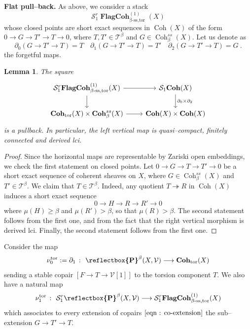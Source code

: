 \documentclass[11pt]{article}
\newtheorem{lemma}[theorem]{Lemma}
\newcommand{\segal}{\mathcal{S}}
\newcommand{\tbeta}{\mathcal{T}^{\beta}}
\newcommand{\tbetastack}{\boldsymbol{\operatorname{Coh}}_{\operatorname{tor}}(X)}
\newcommand{\coh}{\operatorname{Coh}}
\newcommand{\cohbetass}{\operatorname{Coh}^{ss}_{\beta}(X)}
\newcommand{\cohbetassstack}{\boldsymbol{\operatorname{Coh}}^{ss}_{\beta}(X)}
\newcommand{\cohflat}{\boldsymbol{\operatorname{Coh}}}
\newcommand{\framing}{\mathcal{V}}
\newcommand{\copairs}{\boldsymbol{\cop}^{\beta}(X,\mathcal{V})}
\newcommand{\cop}{\reflectbox{\ensuremath{\operatorname{P}}}}
\begin{document}
    \noindent \textbf{Flat pull--back. } As above, we consider a stack
    \[
\segal_1^r\boldsymbol{\operatorname{FlagCoh}}^{(1)}_{\operatorname{\beta-ss,tor}}(X)
    \]
    whose closed points are short exact sequences in $\coh(X)$ of the form $0 \rightarrow G\rightarrow T' \rightarrow T \rightarrow 0$, where $T , T'\in \tbeta$ and $G\in \cohbetass$. Let us denote as
\[
    \partial_0(G\rightarrow T' \rightarrow T) = T \quad \partial_1(G\rightarrow T' \rightarrow T) = T'\quad \partial_2(G\rightarrow T' \rightarrow T) = G \ .
\]
the forgetful maps.
\begin{lemma}\label{lemma : smoothness right action}
The square
 \begin{equation}\label{eqn : aux square smoothness copairs}
         \begin{tikzcd}
	{\segal_1^r\boldsymbol{\operatorname{FlagCoh}}^{(1)}_{\operatorname{\beta-ss,tor}}(X)} & {\segal_1\cohflat(X)}\\
	\tbetastack \times \cohbetassstack & \cohflat(X) \times \cohflat(X)
	\arrow[from=1-1, to=1-2]
	\arrow[from=1-1, to=2-1]
	\arrow[from=1-2, to=2-2, "\partial_0 \times \partial_2"]
	\arrow[""{name=0, anchor=center, inner sep=0}, from=2-1, to=2-2]
    \end{tikzcd}
    \end{equation}
is a pullback. In particular, the left vertical map is quasi--compact, finitely connected and derived lci.
\end{lemma}
    \begin{proof}
    Since the horizontal maps are representable by Zariski open embeddings, we check the first statement on closed points. Let $0 \rightarrow G\rightarrow T \rightarrow T'\rightarrow 0$ be a short exact sequence of coherent sheaves on $X$, where $G\in \cohbetass$ and $T'\in \tbeta$. We claim that $T \in \tbeta$. Indeed, any quotient $T \twoheadrightarrow R$ in $\coh(X)$ induces a short exact sequence
    \[
        0 \rightarrow H \rightarrow R \rightarrow R' \rightarrow 0
    \]
    where $\mu(H) \geq \beta$ and $\mu(R') > \beta$, so that $\mu(R) > \beta$. The second statement follows from the first one, and from the fact that the right vertical morphism is derived lci. Finally, the second statement follows from the first one.
    \end{proof}
    
    \noindent Consider the map
    \begin{equation}\label{eqn : copair to tor}
       \nu^{\operatorname{tor}}_0 := \partial_1 \ \colon \ \copairs \longrightarrow \tbetastack 
    \end{equation}
    sending a stable copair $[F\rightarrow T \rightarrow \framing[1]]$ to the torsion component $T$. We also have a natural map
    \begin{equation}
        \nu^{\operatorname{tor}}_{1} \  \colon \ \segal_1^{r}\copairs \longrightarrow \segal_1^r\boldsymbol{\operatorname{FlagCoh}}^{(1)}_{\operatorname{\beta-ss,tor}}(X)
    \end{equation}
    which associates to every extension of copairs $\eqref{eqn : co-extension}$ the sub--extension $G\rightarrow T' \rightarrow T$.
\end{document}
